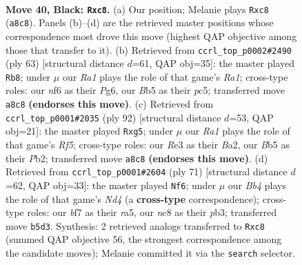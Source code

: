 \documentclass[11pt]{article}
\begin{document}
\clearpage

\begin{figure}[p]\centering
\begin{subfigure}{0.46\textwidth}\centering
\resizebox{\linewidth}{!}{%
\newchessgame
\chessboard[
  setfen={r1N5/1k3B2/5N2/pb3p2/7R/4r3/1P4P1/R2KN3 b - - 0 40},
  showmover=false,
  pgfstyle=straightmove, color=movearrow, markmove={a8-c8}
]}
\caption{}
\end{subfigure}\hfill
\begin{subfigure}{0.46\textwidth}\centering
\resizebox{\linewidth}{!}{%
\newchessgame
\chessboard[
  setfen={r5k1/3R1N2/2p3p1/p1Pn4/R7/4r3/P6P/6K1 b - - 1 32},
  showmover=false,
  pgfstyle=straightmove, color=movearrow, markmove={a8-b8}
]}
\caption{}
\end{subfigure}
\\[4pt]
\begin{subfigure}{0.46\textwidth}\centering
\resizebox{\linewidth}{!}{%
\newchessgame
\chessboard[
  setfen={5r1k/p6p/4RP2/1p3Rr1/8/7P/BP1n3K/8 w - - 2 47},
  showmover=false,
  pgfstyle=straightmove, color=movearrow, markmove={f5-g5}
]}
\caption{}
\end{subfigure}\hfill
\begin{subfigure}{0.46\textwidth}\centering
\resizebox{\linewidth}{!}{%
\newchessgame
\chessboard[
  setfen={2r4k/6p1/7p/R1Nn4/1r1p2R1/1P5P/5P2/6K1 b - - 3 36},
  showmover=false,
  pgfstyle=straightmove, color=movearrow, markmove={d5-f6}
]}
\caption{}
\end{subfigure}
\caption{\textbf{Move 40, Black: \texttt{Rxc8}.} (a) Our position; Melanie plays \texttt{Rxc8} (\texttt{a8c8}). Panels (b)--(d) are the retrieved master positions whose correspondence most drove this move (highest QAP objective among those that transfer to it). (b) Retrieved from \texttt{ccrl\_top\_p0002\#2490} (ply 63) [structural distance $d$=61, QAP obj=35]: the master played \texttt{Rb8}; under $\mu$ our \emph{Ra1} plays the role of that game's \emph{Ra1}; cross-type roles: our \emph{n}f6 as their \emph{P}g6, our \emph{B}b5 as their \emph{p}c5; transferred move \texttt{a8c8} \textbf{(endorses this move)}. (c) Retrieved from \texttt{ccrl\_top\_p0001\#2035} (ply 92) [structural distance $d$=53, QAP obj=21]: the master played \texttt{Rxg5}; under $\mu$ our \emph{Ra1} plays the role of that game's \emph{Rf5}; cross-type roles: our \emph{R}e3 as their \emph{B}a2, our \emph{B}b5 as their \emph{P}b2; transferred move \texttt{a8c8} \textbf{(endorses this move)}. (d) Retrieved from \texttt{ccrl\_top\_p0001\#2604} (ply 71) [structural distance $d$=62, QAP obj=33]: the master played \texttt{Nf6}; under $\mu$ our \emph{Bb4} plays the role of that game's \emph{Nd4} (a \textbf{cross-type} correspondence); cross-type roles: our \emph{b}f7 as their \emph{r}a5, our \emph{n}c8 as their \emph{p}b3; transferred move \texttt{b5d3}. Synthesis: 2 retrieved analogs transferred to \texttt{Rxc8} (summed QAP objective 56, the strongest correspondence among the candidate moves); Melanie committed it via the \texttt{search} selector.}
\label{fig:thought-m79}
\end{figure}
\end{document}
